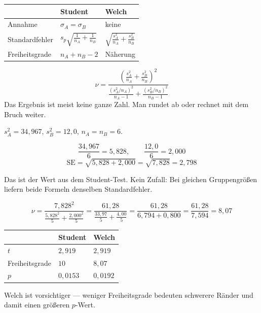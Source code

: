 \begin{merksatz}
\begin{center}
{\small
\renewcommand{\arraystretch}{1.55}
\begin{tabular}{@{}P{2.2cm}P{3.0cm}P{3.0cm}@{}}
\toprule
& \textbf{Student} & \textbf{Welch}\\
\midrule
Annahme & $\sigma_A = \sigma_B$ & \textcolor{gruen}{keine}\\
Standard\-fehler & $s_p\sqrt{\tfrac{1}{n_A}+\tfrac{1}{n_B}}$ & $\sqrt{\tfrac{s_A^2}{n_A}+\tfrac{s_B^2}{n_B}}$\\
Freiheits\-grade & $n_A+n_B-2$ & \textcolor{akzent}{Näherung}\\
\bottomrule
\end{tabular}}
\end{center}

\[ \nu = \frac{\left(\frac{s_A^2}{n_A}+\frac{s_B^2}{n_B}\right)^2}{\frac{(s_A^2/n_A)^2}{n_A-1} + \frac{(s_B^2/n_B)^2}{n_B-1}} \]
Das Ergebnis ist meist keine ganze Zahl. Man rundet ab oder rechnet mit dem Bruch weiter.
\end{merksatz}

\begin{merksatz}
$s_A^2 = 34{,}967$, $s_B^2 = 12{,}0$, $n_A = n_B = 6$.

\[ \frac{34{,}967}{6} = 5{,}828, \qquad \frac{12{,}0}{6} = 2{,}000 \]
\[ \mathrm{SE} = \sqrt{5{,}828 + 2{,}000} = \sqrt{7{,}828} = 2{,}798 \]

Das ist  der Wert aus dem Student-Test. Kein Zufall: Bei gleichen Gruppengrößen liefern beide Formeln denselben Standardfehler.

\[ \nu = \frac{7{,}828^2}{\frac{5{,}828^2}{5} + \frac{2{,}000^2}{5}} = \frac{61{,}28}{\frac{33{,}97}{5} + \frac{4{,}00}{5}} = \frac{61{,}28}{6{,}794 + 0{,}800} = \frac{61{,}28}{7{,}594} = 8{,}07 \]

\begin{center}
\renewcommand{\arraystretch}{1.48}
\begin{tabular}{@{}P{2.4cm}P{2.2cm}P{2.2cm}@{}}
\toprule
& \textbf{Student} & \textbf{Welch}\\
\midrule
$t$ & $2{,}919$ & $2{,}919$\\
Freiheitsgrade & $10$ & $8{,}07$\\
$p$ & $0{,}0153$ & $0{,}0192$\\
\bottomrule
\end{tabular}
\end{center}

Welch ist vorsichtiger --- weniger Freiheitsgrade bedeuten schwerere Ränder und damit einen größeren $p$-Wert.
\end{merksatz}

